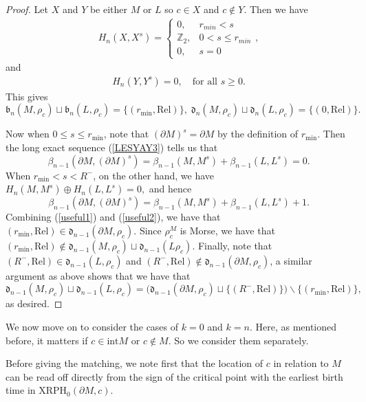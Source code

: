 \documentclass[a4paper,11pt]{article}
\theoremstyle{definition}
\newcommand{\Z}{\mathbb{Z}}
\begin{document}
\begin{proof}
Let $X$ and $Y$ be either $M$ or $L$ so $c\in X$ and $c\notin Y$. Then we have 
\begin{align}\label{step1}H_n(X,X^s)=\begin{cases} 0,&  r_{min} < s \\ \Z_2, & 0<s\leq r_{min}\\ 0, & s = 0\end{cases},\end{align} and 
\begin{align}\label{step2}H_n(Y,Y^s)=0, \quad \text{for all $s\ge 0$}. \end{align} 
This gives $$\mathfrak{b}_n(M,\rho_c)\sqcup  \mathfrak{b}_n(L,\rho_c)=\{(r_{\min},\text{Rel})\} ,\;
\mathfrak{d}_n(M,\rho_c)\sqcup  \mathfrak{d}_n(L,\rho_c) = \{(0,\text{Rel})\}.$$

Now when $0\leq s\leq r_{\min}$, note that $(\partial M)^s = \partial M$ by the definition of $r_{\min}$. Then the long exact sequence (\ref{LESYAY3}) tells us that 
\begin{equation}\label{useful1}
\beta_{n-1}(\partial M,(\partial M)^s) = \beta_{n-1}(M,M^s)+\beta_{n-1}(L,L^s)=0.\end{equation} When $r_{\min}< s< R^-$, on the other hand, we have $H_{n}(M,M^s)\oplus H_{n}(L,L^s)=0,$ and hence
\begin{equation}\label{useful2}\beta_{n-1}(\partial M,(\partial M)^s) = \beta_{n-1}(M,M^s)+\beta_{n-1}(L,L^s)+1.
\end{equation}
Combining (\ref{useful1}) and (\ref{useful2}), we have that $(r_{\min},\mathrm{Rel})\in \mathfrak{d}_{n-1}(\partial M,\rho_c).$ Since $\rho_c^M$ is Morse, we have that $(r_{\min},\mathrm{Rel})\not\in \mathfrak{d}_{n-1}(M,\rho_c)\sqcup \mathfrak{d}_{n-1}(L\rho_c)$. 
Finally, note that $(R^-,\mathrm{Rel})\in \mathfrak{d}_{n-1}(L,\rho_c)$ and $(R^-,\mathrm{Rel})\notin \mathfrak{d}_{n-1}(\partial M,\rho_c)$, a similar argument as above shows that we have that $$\mathfrak{d}_{n-1}(M,\rho_c)\sqcup  \mathfrak{d}_{n-1}(L,\rho_c)= \big(\mathfrak{d}_{n-1}(\partial M,\rho_c)\sqcup \{(R^-,\text{Rel})\} \big)\backslash \{(r_{\min},\text{Rel})\},$$ as desired.
\end{proof}


We now move on to consider the cases of $k=0$ and $k=n$. Here, as mentioned before, it matters if $c\in \mathrm{int} M$ or $c\not\in M$. So we consider them separately. 

Before giving the matching, we note first that the location of $c$ in relation to $M$ can be read off directly from the sign of the critical point with the earliest birth time in $\mathrm{XRPH}_0(\partial M,c).$
\end{document}

